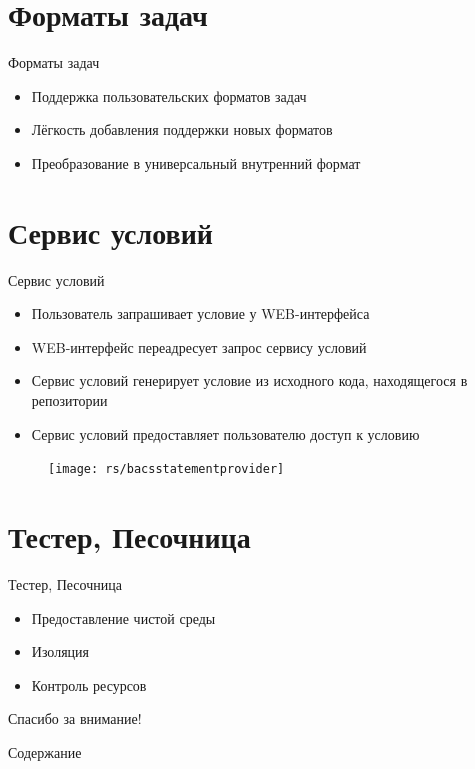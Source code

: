 \documentclass[xetex,mathserif,serif,10pt]{beamer}
\newenvironment{sframe}[2]{\section{#1}\begin{frame}[label=#2]{#1}}{\end{frame}}
\begin{document}
    \begin{sframe}{Форматы задач}{bacsproblem}
        \begin{itemize}
            \item Поддержка пользовательских форматов задач
            \item Лёгкость добавления поддержки новых форматов
            \item Преобразование в универсальный внутренний формат
        \end{itemize}
    \end{sframe}

    \begin{sframe}{Сервис условий}{bacsstatementprovider}
        \begin{itemize}
            \item Пользователь запрашивает условие у WEB-интерфейса
            \item WEB-интерфейс переадресует запрос сервису условий
            \item Сервис условий генерирует условие из исходного кода,
                находящегося в репозитории
            \item Сервис условий предоставляет пользователю доступ к условию
        \end{itemize}
        \begin{figure}
            \centering
            \texttt{[image: rs/bacsstatementprovider]}
        \end{figure}
    \end{sframe}

    \begin{sframe}{Тестер, Песочница}{sandbox}
        \begin{itemize}
            \item Предоставление чистой среды
            \item Изоляция
            \item Контроль ресурсов
        \end{itemize}
        \begin{figure}
            \resizebox{\columnwidth}{!}{
                
            }
        \end{figure}
    \end{sframe}

    \begin{frame}
        \Large\centering Спасибо за внимание!
    \end{frame}

    \begin{frame}{Содержание}
        \tableofcontents
    \end{frame}
\end{document}
